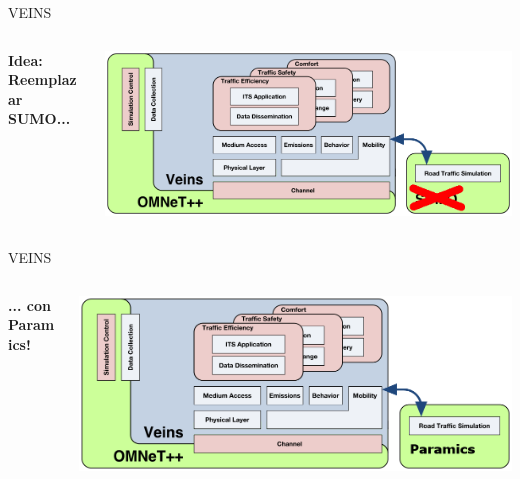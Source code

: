 \documentclass[aspectratio=169]{beamer}
\begin{document}
\begin{frame}{VEINS}
\begin{columns}
\begin{column}{.3\linewidth}
    \centering
    \textbf{Idea: Reemplazar SUMO...}
\end{column}
\begin{column}{.7\linewidth}
    \centering
    \includegraphics[width=\linewidth]{figuras/veins-arch-nosumo.png}
\end{column}
\end{columns}
\end{frame}

\begin{frame}{VEINS}
\begin{columns}
\begin{column}{.3\linewidth}
\centering
\textbf{... con Paramics!}
\end{column}
\begin{column}{.7\linewidth}
\centering
\includegraphics[width=\linewidth]{figuras/veins-arch-paramics.png}
\end{column}
\end{columns}
\end{frame}
\end{document}
